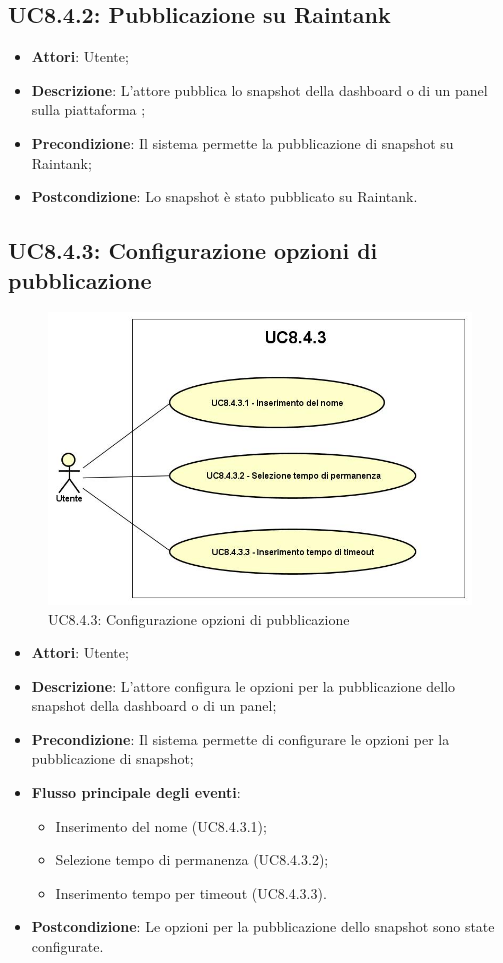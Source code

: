 \subsection{UC8.4.2: Pubblicazione su Raintank}
\hypertarget{UC8.4.2}{}
\begin{itemize}
	\item \textbf{Attori}: Utente;
	\item \textbf{Descrizione}: L'attore pubblica lo snapshot della dashboard o di un panel sulla piattaforma ;
	\item \textbf{Precondizione}: Il sistema permette la pubblicazione di snapshot su Raintank;
	\item \textbf{Postcondizione}: Lo snapshot è stato pubblicato su Raintank.
\end{itemize}

\subsection{UC8.4.3: Configurazione opzioni di pubblicazione}
\hypertarget{UC8.4.3}{}
\begin{figure} [H]
	\centering
	\includegraphics[scale=0.45]{Img/UC8-4-3}
	\caption{UC8.4.3: Configurazione opzioni di pubblicazione}\label{}
\end{figure}
\begin{itemize}
	\item \textbf{Attori}: Utente;
	\item \textbf{Descrizione}: L'attore configura le opzioni per la pubblicazione dello snapshot della dashboard o di un panel;
	\item \textbf{Precondizione}: Il sistema permette di configurare le opzioni per la pubblicazione di snapshot;
	\item \textbf{Flusso principale degli eventi}:
		\begin{itemize}
		\item Inserimento del nome (UC8.4.3.1);
		\item Selezione tempo di permanenza (UC8.4.3.2);
		\item Inserimento tempo per timeout (UC8.4.3.3).
	\end{itemize}
	\item \textbf{Postcondizione}: Le opzioni per la pubblicazione dello snapshot sono state configurate.
\end{itemize}

